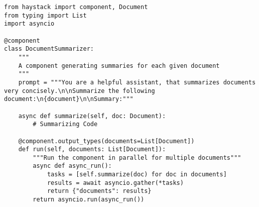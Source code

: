 \begin{verbatim}
from haystack import component, Document
from typing import List
import asyncio

@component
class DocumentSummarizer:
    """
    A component generating summaries for each given document
    """
    prompt = """You are a helpful assistant, that summarizes documents very concisely.\n\nSummarize the following document:\n{document}\n\nSummary:"""

    async def summarize(self, doc: Document):
        # Summarizing Code

    @component.output_types(documents=List[Document])
    def run(self, documents: List[Document]):
        """Run the component in parallel for multiple documents"""
        async def async_run():
            tasks = [self.summarize(doc) for doc in documents]
            results = await asyncio.gather(*tasks)
            return {"documents": results}
        return asyncio.run(async_run())


\end{verbatim}